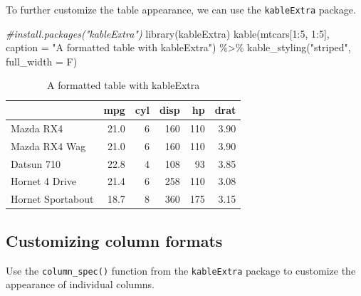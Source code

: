 \documentclass[
]{book}
\newenvironment{Shaded}{\begin{snugshade}}{\end{snugshade}}
\newcommand{\AttributeTok}[1]{\textcolor[rgb]{0.77,0.63,0.00}{#1}}
\newcommand{\CommentTok}[1]{\textcolor[rgb]{0.56,0.35,0.01}{\textit{#1}}}
\newcommand{\DecValTok}[1]{\textcolor[rgb]{0.00,0.00,0.81}{#1}}
\newcommand{\FunctionTok}[1]{\textcolor[rgb]{0.00,0.00,0.00}{#1}}
\newcommand{\NormalTok}[1]{#1}
\newcommand{\SpecialCharTok}[1]{\textcolor[rgb]{0.00,0.00,0.00}{#1}}
\newcommand{\StringTok}[1]{\textcolor[rgb]{0.31,0.60,0.02}{#1}}
\begin{document}
To further customize the table appearance, we can use the \texttt{kableExtra} package.

\begin{Shaded}
\begin{Highlighting}[]
\CommentTok{\#install.packages("kableExtra") }
\FunctionTok{library}\NormalTok{(kableExtra)}
\FunctionTok{kable}\NormalTok{(mtcars[}\DecValTok{1}\SpecialCharTok{:}\DecValTok{5}\NormalTok{, }\DecValTok{1}\SpecialCharTok{:}\DecValTok{5}\NormalTok{], }\AttributeTok{caption =} \StringTok{"A formatted table with kableExtra"}\NormalTok{) }\SpecialCharTok{\%\textgreater{}\%}
  \FunctionTok{kable\_styling}\NormalTok{(}\StringTok{"striped"}\NormalTok{, }\AttributeTok{full\_width =}\NormalTok{ F)}
\end{Highlighting}
\end{Shaded}

\begin{table}

\caption{\label{tab:unnamed-chunk-3}A formatted table with kableExtra}
\centering
\begin{tabular}[t]{l|r|r|r|r|r}
\hline
  & mpg & cyl & disp & hp & drat\\
\hline
Mazda RX4 & 21.0 & 6 & 160 & 110 & 3.90\\
\hline
Mazda RX4 Wag & 21.0 & 6 & 160 & 110 & 3.90\\
\hline
Datsun 710 & 22.8 & 4 & 108 & 93 & 3.85\\
\hline
Hornet 4 Drive & 21.4 & 6 & 258 & 110 & 3.08\\
\hline
Hornet Sportabout & 18.7 & 8 & 360 & 175 & 3.15\\
\hline
\end{tabular}
\end{table}

\hypertarget{customizing-column-formats}{%
\subsection{Customizing column formats}\label{customizing-column-formats}}

Use the \texttt{column\_spec()} function from the \texttt{kableExtra} package to customize the appearance of individual columns.
\end{document}
